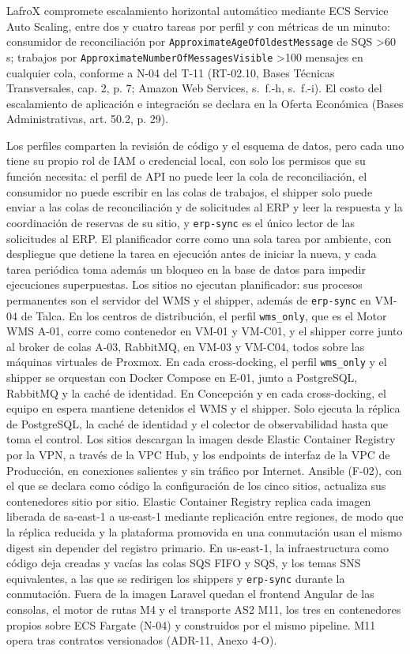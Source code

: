 {\raggedright LafroX compromete escalamiento horizontal automático mediante ECS Service Auto Scaling, entre dos y cuatro tareas por perfil y con métricas de un minuto: consumidor de reconciliación por \texttt{ApproximateAgeOfOldestMessage} de SQS >60 s; trabajos por \texttt{ApproximateNumberOfMessagesVisible} >100 mensajes en cualquier cola, conforme a N-04 del T-11 (RT-02.10, Bases Técnicas Transversales, cap. 2, p. 7; Amazon Web Services, s.~f.-h, s.~f.-i). El costo del escalamiento de aplicación e integración se declara en la Oferta Económica (Bases Administrativas, art. 50.2, p. 29).\par}

Los perfiles comparten la revisión de código y el esquema de datos, pero cada uno tiene su propio rol de IAM o credencial local, con solo los permisos que su función necesita: el perfil de API no puede leer la cola de reconciliación, el consumidor no puede escribir en las colas de trabajos, el shipper solo puede enviar a las colas de reconciliación y de solicitudes al ERP y leer la respuesta y la coordinación de reservas de su sitio, y \texttt{erp-sync} es el único lector de las solicitudes al ERP. El planificador corre como una sola tarea por ambiente, con despliegue que detiene la tarea en ejecución antes de iniciar la nueva, y cada tarea periódica toma además un bloqueo en la base de datos para impedir ejecuciones superpuestas. Los sitios no ejecutan planificador: sus procesos permanentes son el servidor del WMS y el shipper, además de \texttt{erp-sync} en VM-04 de Talca. En los centros de distribución, el perfil \texttt{wms\_only}, que es el Motor WMS A-01, corre como contenedor en VM-01 y VM-C01, y el shipper corre junto al broker de colas A-03, RabbitMQ, en VM-03 y VM-C04, todos sobre las máquinas virtuales de Proxmox. En cada cross-docking, el perfil \texttt{wms\_only} y el shipper se orquestan con Docker Compose en E-01, junto a PostgreSQL, RabbitMQ y la caché de identidad. En Concepción y en cada cross-docking, el equipo en espera mantiene detenidos el WMS y el shipper. Solo ejecuta la réplica de PostgreSQL, la caché de identidad y el colector de observabilidad hasta que toma el control. Los sitios descargan la imagen desde Elastic Container Registry por la VPN, a través de la VPC Hub, y los endpoints de interfaz de la VPC de Producción, en conexiones salientes y sin tráfico por Internet. Ansible (F-02), con el que se declara como código la configuración de los cinco sitios, actualiza sus contenedores sitio por sitio. Elastic Container Registry replica cada imagen liberada de sa-east-1 a us-east-1 mediante replicación entre regiones, de modo que la réplica reducida y la plataforma promovida en una conmutación usan el mismo digest sin depender del registro primario. En us-east-1, la infraestructura como código deja creadas y vacías las colas SQS FIFO y SQS, y los temas SNS equivalentes, a las que se redirigen los shippers y \texttt{erp-sync} durante la conmutación. Fuera de la imagen Laravel quedan el frontend Angular de las consolas, el motor de rutas M4 y el transporte AS2 M11, los tres en contenedores propios sobre ECS Fargate (N-04) y construidos por el mismo pipeline. M11 opera tras contratos versionados (ADR-11, Anexo 4-O).

